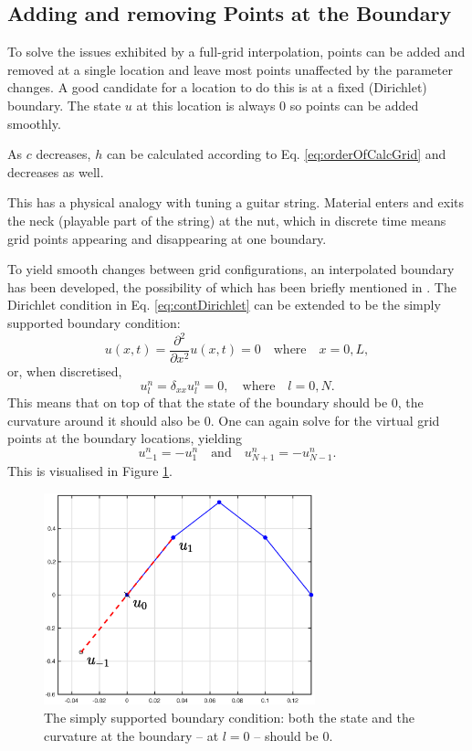 \subsection{Adding and removing Points at the Boundary}\label{sec:addAtBoundary}
To solve the issues exhibited by a full-grid interpolation, points can be added and removed at a single location and leave most points unaffected by the parameter changes. A good candidate for a location to do this is at a fixed (Dirichlet) boundary. The state $u$ at this location is always $0$ so points can be added smoothly. 

As $c$ decreases, $h$ can be calculated according to Eq. \eqref{eq:orderOfCalcGrid} and decreases as well.

This has a physical analogy with tuning a guitar string. Material enters and exits the neck (playable part of the string) at the nut, which in discrete time means grid points appearing and disappearing at one boundary.

To yield smooth changes between grid configurations, an interpolated boundary has been developed, the possibility of which has been briefly mentioned in \cite[p. 145]{theBible}. The Dirichlet condition in Eq. \eqref{eq:contDirichlet} can be extended to be the simply supported boundary condition:
\begin{equation}
    u(x, t) = \frac{\partial^2}{\partial x^2}u(x, t) = 0 \quad \text{where} \quad x = 0, L,
\end{equation}
or, when discretised,
\begin{equation}\label{eq:simplySupportedDiscrete}
    u_l^n = \delta_{xx}u_l^n = 0, \quad \text{where} \quad l = 0, N.
\end{equation}
This means that on top of that the state of the boundary should be $0$, the curvature around it should also be $0$. One can again solve for the virtual grid points at the boundary locations, yielding
\begin{equation}
    u_{-1}^n = -u_1^n \quad \text{and} \quad u_{N+1}^n = -u_{N-1}^n.
\end{equation}
This is visualised in Figure \ref{fig:simplySupportedBound}.

\begin{figure}
    \centering
    \includegraphics[width=0.7\textwidth]{figures/contributions/dynamicgrid/simplySupportedBoundary.eps}
    \caption{\label{fig:simplySupportedBound}{The simply supported boundary condition: both the state and the curvature at the boundary -- at $l=0$ -- should be $0$.}}
\end{figure} 

